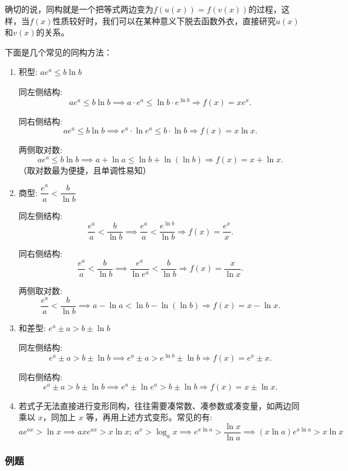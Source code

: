 \documentclass{article}
\begin{document}
确切的说，同构就是一个把等式两边变为$f(u(x))=f(v(x))$的过程，这样，当$f(x)$性质较好时，我们可以在某种意义下脱去函数外衣，直接研究$u(x)$和$v(x)$的关系。

下面是几个常见的同构方法：
\begin{enumerate}
    \item 积型: \(ae^a \leq b\ln b\)

    同左侧结构:
    \[
    ae^a \leq b\ln b \implies a \cdot e^a \leq \ln b \cdot e^{\ln b} \Rightarrow f(x) = xe^x.
    \]

    同右侧结构:
    \[
    ae^a \leq b\ln b \implies e^a \cdot \ln e^a \leq b \cdot \ln b \Rightarrow f(x) = x\ln x.
    \]

    两侧取对数:
    \[
    ae^a \leq b\ln b \implies a + \ln a \leq \ln b + \ln(\ln b) \Rightarrow f(x) = x + \ln x.
    \]
    （取对数最为便捷，且单调性易知）

    \item 商型: \(\dfrac{e^a}{a} < \dfrac{b}{\ln b}\)

    同左侧结构:
    \[
    \frac{e^a}{a} < \frac{b}{\ln b} \implies \frac{e^a}{a} < \frac{e^{\ln b}}{\ln b} \Rightarrow f(x) = \frac{e^x}{x}.
    \]

    同右侧结构:
    \[
    \frac{e^a}{a} < \frac{b}{\ln b} \implies \frac{e^a}{\ln e^a} < \frac{b}{\ln b} \Rightarrow f(x) = \frac{x}{\ln x}.
    \]

    两侧取对数:
    \[
    \frac{e^a}{a} < \frac{b}{\ln b} \implies a - \ln a < \ln b - \ln(\ln b) \Rightarrow f(x) = x - \ln x.
    \]

    \item 和差型: \(e^a \pm a > b \pm \ln b\)

    同左侧结构:
    \[
    e^a \pm a > b \pm \ln b \implies e^a \pm a > e^{\ln b} \pm \ln b \Rightarrow f(x) = e^x \pm x.
    \]

    同右侧结构:
    \[
    e^a \pm a > b \pm \ln b \implies e^a \pm \ln e^a > b \pm \ln b \Rightarrow f(x) = x \pm \ln x.
    \]

    \item 若式子无法直接进行变形同构，往往需要凑常数、凑参数或凑变量，如两边同乘以 \(x\)，同加上 \(x\) 等，再用上述方式变形。常见的有:
    \[
    ae^{ax} > \ln x \implies axe^{ax} > x\ln x;\ a^x > \log_a x \implies e^{x\ln a} > \frac{\ln x}{\ln a} \implies (x\ln a)e^{x\ln a} > x\ln x
    \]

\end{enumerate}

\subsubsection{例题}
\end{document}
